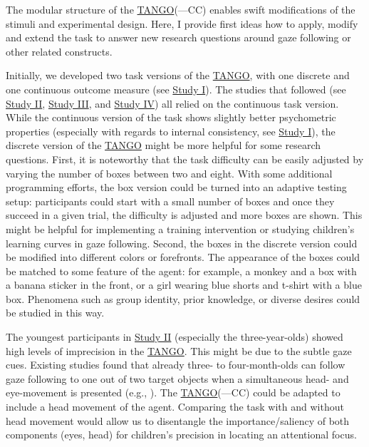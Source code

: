 \documentclass[
]{scrbook}
\begin{document}
The modular structure of the \hyperref[acronyms_TANGO]{TANGO}(---CC) enables swift modifications of the stimuli and experimental design. Here, I provide first ideas how to apply, modify and extend the task to answer new research questions around gaze following or other related constructs.

Initially, we developed two task versions of the \hyperref[acronyms_TANGO]{TANGO}, with one discrete and one continuous outcome measure (see \hyperref[studyI]{Study I}). The studies that followed (see \hyperref[studyII]{Study II}, \hyperref[studyIII]{Study III}, and \hyperref[studyIV]{Study IV}) all relied on the continuous task version. While the continuous version of the task shows slightly better psychometric properties (especially with regards to internal consistency, see \hyperref[studyI]{Study I}), the discrete version of the \hyperref[acronyms_TANGO]{TANGO} might be more helpful for some research questions. First, it is noteworthy that the task difficulty can be easily adjusted by varying the number of boxes between two and eight. With some additional programming efforts, the box version could be turned into an adaptive testing setup: participants could start with a small number of boxes and once they succeed in a given trial, the difficulty is adjusted and more boxes are shown. This might be helpful for implementing a training intervention or studying children's learning curves in gaze following. Second, the boxes in the discrete version could be modified into different colors or forefronts. The appearance of the boxes could be matched to some feature of the agent: for example, a monkey and a box with a banana sticker in the front, or a girl wearing blue shorts and t-shirt with a blue box. Phenomena such as group identity, prior knowledge, or diverse desires could be studied in this way.

The youngest participants in \hyperref[studyII]{Study II} (especially the three-year-olds) showed high levels of imprecision in the \hyperref[acronyms_TANGO]{TANGO}. This might be due to the subtle gaze cues. Existing studies found that already three- to four-month-olds can follow gaze following to one out of two target objects when a simultaneous head- and eye-movement is presented (e.g., ). The \hyperref[acronyms_TANGO]{TANGO}(---CC) could be adapted to include a head movement of the agent. Comparing the task with and without head movement would allow us to disentangle the importance/saliency of both components (eyes, head) for children's precision in locating an attentional focus.
\end{document}
